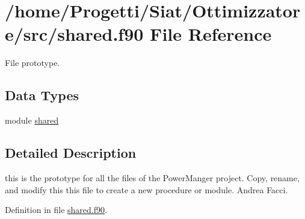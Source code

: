 \hypertarget{shared_8f90}{\section{/home/\-Progetti/\-Siat/\-Ottimizzatore/src/shared.f90 File Reference}
\label{shared_8f90}
}


File prototype.  


\subsection*{Data Types}
\begin{DoxyCompactItemize}
\item 
module \hyperlink{classshared}{shared}
\end{DoxyCompactItemize}


\subsection{Detailed Description}
this is the prototype for all the files of the Power\-Manger project. Copy, rename, and modify this this file to create a new procedure or module.  Andrea Facci. 

Definition in file \hyperlink{shared_8f90_source}{shared.\-f90}.

